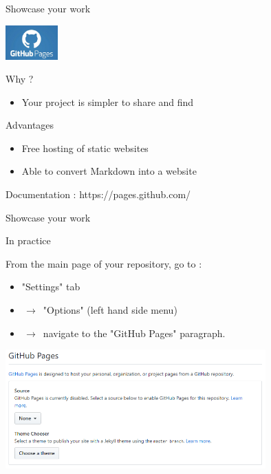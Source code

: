 \begin{frame}{Showcase your work}

\begin{center}
    \includegraphics[width=2cm]{08_sharing/images/github_pages.png}
\end{center}

Why ? 

\begin{itemize}
    \item Your project is simpler to share and find
\end{itemize}

Advantages

\begin{itemize}
    \item Free hosting of static websites
    \item Able to convert Markdown into a website
\end{itemize}

Documentation : https://pages.github.com/
\end{frame}

\begin{frame}{Showcase your work}

In practice

From the main page of your repository, go to :
\begin{itemize}
    \item "Settings" tab
    \item $\,\to\,$ "Options" (left hand side menu)
    \item $\,\to\,$ navigate to the "GitHub Pages" paragraph.
\end{itemize}

\begin{center}
    \includegraphics[width=10cm]{08_sharing/images/github_pages_settings.png}
\end{center}

\end{frame}

